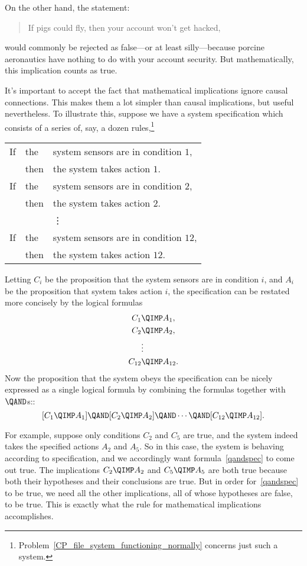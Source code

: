 On the other hand, the statement:
\begin{quote}
If pigs could fly, then your account won't get hacked,
\end{quote}
would commonly be rejected as false---or at least silly---because
porcine aeronautics have nothing to do with your account security.
But mathematically, this implication counts as true.

It's important to accept the fact that mathematical implications
ignore causal connections.  This makes them a lot simpler than causal
implications, but useful nevertheless.  To illustrate this, suppose we
have a system specification which consists of a series of, say, a
dozen rules,\footnote{
  Problem~\ref{CP_file_system_functioning_normally} concerns just such
  a system.}
\begin{center}
\begin{tabular}{rll}
If & the  & system sensors are in condition $1$,\\
   & then & the system takes action $1$.\\
If & the  & system sensors are in condition $2$,\\
   & then &  the system takes action $2$.\\
   &      &\vdots\\
If & the  & system sensors are in condition $12$,\\
   & then & the system takes action $12$.\\
\end{tabular}
\end{center}

Letting $C_i$ be the proposition that the system sensors are in
condition $i$, and $A_i$ be the proposition that system takes action
$i$, the specification can be restated more concisely by the logical
formulas
\begin{align*}
C_1  &\QIMP A_1,\\
C_2  &\QIMP A_2,\\
     &\vdots\\
C_{12}&\QIMP A_{12}.
\end{align*}
Now the proposition that the system obeys the specification can be
nicely expressed as a single logical formula by combining the formulas
together with $\QAND$s::
\begin{equation}\label{qandspec}
[C_1 \QIMP A_1] \QAND [C_2 \QIMP A_2] \QAND \cdots \QAND [C_{12} \QIMP A_{12}].
\end{equation}

For example, suppose only conditions $C_2$ and $C_5$ are true, and the
system indeed takes the specified actions $A_2$ and $A_5$.  So in this
case, the system is behaving according to specification, and we
accordingly want formula~\eqref{qandspec} to come out true.  The
implications $C_2 \QIMP A_2$ and $C_5 \QIMP A_5$ are both true because
both their hypotheses and their conclusions are true.  But in order
for~\eqref{qandspec} to be true, we need all the other implications,
all of whose hypotheses are false, to be true.  This is exactly what
the rule for mathematical implications accomplishes.

